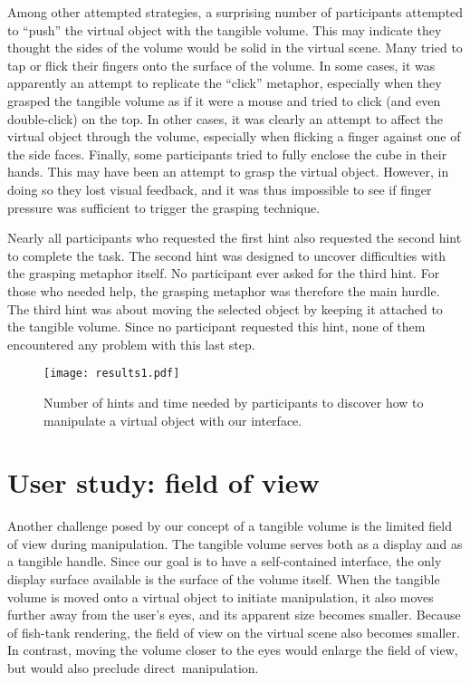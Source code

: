\documentclass{vgtc}                         \havecopyrightspacefalse
\begin{document}
Among other attempted strategies, a surprising number of participants attempted to ``push'' the virtual object with the tangible volume. This may indicate they thought the sides of the volume would be solid in the virtual scene. Many tried to tap or flick their fingers onto the surface of the volume. In some cases, it was apparently an attempt to replicate the ``click'' metaphor, especially when they grasped the tangible volume as if it were a mouse and tried to click (and even double-click) on the top. In other cases, it was clearly an attempt to affect the virtual object through the volume, especially when flicking a finger against one of the side faces. Finally, some participants tried to fully enclose the cube in their hands. This may have been an attempt to grasp the virtual object. However, in doing so they lost visual feedback, and it was thus impossible to see if finger pressure was sufficient to trigger the grasping technique.

Nearly all participants who requested the first hint also requested the second hint to complete the task. The second hint was designed to uncover difficulties with the grasping metaphor itself. No participant ever asked for the third hint. For those who needed help, the grasping metaphor was therefore the main hurdle. The third hint was about moving the selected object by keeping it attached to the tangible volume. Since no participant requested this hint, none of them encountered any problem with this last step.

\begin{figure}[t]
  \centering
  \texttt{[image: results1.pdf]}
  \caption{Number of hints and time needed by participants to discover how to manipulate a virtual object with our interface.}
  \label{fig:results1}
\end{figure}

\section{User study: field of view}

Another challenge posed by our concept of a tangible volume is the limited field of view during manipulation. The tangible volume serves both as a display and as a tangible handle. Since our goal is to have a self-contained interface, the only display surface available is the surface of the volume itself. When the tangible volume is moved onto a virtual object to initiate manipulation, it also moves further away from the user's eyes, and its apparent size becomes smaller. Because of fish-tank rendering, the field of view on the virtual scene also becomes smaller. In contrast, moving the volume closer to the eyes would enlarge the field of view, but would also preclude direct~manipulation.
\end{document}
